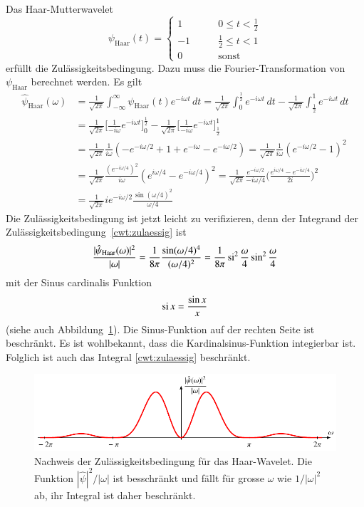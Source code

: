\begin{beispiel}
Das Haar-Mutterwavelet
\[
\psi_{\text{Haar}}(t) = \begin{cases}
 1&\qquad 0\le t < \frac12\\
-1&\qquad \frac12 \le t < 1\\
 0&\qquad \text{sonst}
\end{cases}
\]
erfüllt die Zulässigkeitsbedingung.
Dazu muss die Fourier-Transformation von $\psi_{\text{Haar}}$ berechnet
werden.
Es gilt
\begin{align*}
\hat{\psi}_{\text{Haar}}(\omega)
&=
\frac{1}{\sqrt{2\pi}}
\int_{-\infty}^\infty \psi_{\text{Haar}}(t) e^{-i\omega t}\,dt
=
\frac{1}{\sqrt{2\pi}}
\int_0^{\frac12} e^{-i\omega t}\,dt
-
\frac1{\sqrt{2\pi}}
\int_{\frac12}^1e^{-i\omega t}\,dt
\\
&=
\frac1{\sqrt{2\pi}}
\biggl[\frac1{-i\omega}e^{-i\omega t} \biggr]_0^{\frac12}
-
\frac1{\sqrt{2\pi}}
\biggl[\frac1{-i\omega}e^{-i\omega t} \biggr]_{\frac12}^1
\\
&=
\frac{1}{\sqrt{2\pi}}
\frac{1}{i\omega}
(
-e^{-i\omega/2} + 1 + e^{-i\omega} - e^{-i\omega/2}
)
=
\frac{1}{\sqrt{2\pi}}
\frac{1}{i\omega}
( e^{-i\omega/2}-1)^2
\\
&=
\frac{1}{\sqrt{2\pi}}
\frac{(e^{-i\omega/4})^2}{i\omega}
( e^{i\omega/4} - e^{-i\omega/4})^2
=
\frac{1}{\sqrt{2\pi}}
\frac{e^{-i\omega/2}}{-i\omega/4}
\biggl(\frac{e^{i\omega/4}-e^{-i\omega/4}}{2i}\biggr)^2
\\
&=
\frac{1}{\sqrt{2\pi}}
ie^{-i\omega/2}
\frac{\sin(\omega/4)^2}{\omega/4}
\end{align*}
Die Zulässigkeitsbedingung ist jetzt leicht zu verifizieren, denn
der Integrand der Zulässigkeitsbedingung~\eqref{cwt:zulaessig} ist
\[
\frac{|\hat{\psi}_{\text{Haar}}(\omega)|^2}{|\omega|}
=
\frac{1}{8\pi}\frac{\sin(\omega/4)^4}{(\omega/4)^2}
=
\frac{1}{8\pi}\si^2\frac{\omega}4 \sin^2 \frac{\omega}4
\]
mit der Sinus cardinalis Funktion
\[
\si x = \frac{\sin x}{x}
\]
(siehe auch Abbildung~\ref{cwt:figure:haarzulaessig}).
Die Sinus-Funktion auf der rechten Seite ist beschränkt.
Es ist wohlbekannt, dass die Kardinalsinus-Funktion integierbar ist.
Folglich ist auch das Integral \eqref{cwt:zulaessig} beschränkt.
\end{beispiel}

\begin{figure}
\centering
\includegraphics{chapters/4-cwt/images/hatpsi.pdf}
\caption{Nachweis der Zulässigkeitsbedingung für das Haar-Wavelet.
Die Funktion $|\hat{\psi}|^2/|\omega|$ ist besschränkt und fällt
für grosse $\omega$ wie $1/|\omega|^2$ ab, ihr Integral ist daher
beschränkt.
\label{cwt:figure:haarzulaessig}}
\end{figure}

